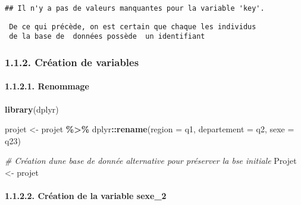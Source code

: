 \documentclass[
]{article}
\newenvironment{Shaded}{\begin{snugshade}}{\end{snugshade}}
\newcommand{\AttributeTok}[1]{\textcolor[rgb]{0.13,0.29,0.53}{#1}}
\newcommand{\CommentTok}[1]{\textcolor[rgb]{0.56,0.35,0.01}{\textit{#1}}}
\newcommand{\FunctionTok}[1]{\textcolor[rgb]{0.13,0.29,0.53}{\textbf{#1}}}
\newcommand{\NormalTok}[1]{#1}
\newcommand{\OtherTok}[1]{\textcolor[rgb]{0.56,0.35,0.01}{#1}}
\newcommand{\SpecialCharTok}[1]{\textcolor[rgb]{0.81,0.36,0.00}{\textbf{#1}}}
\begin{document}
\begin{verbatim}
## Il n'y a pas de valeurs manquantes pour la variable 'key'.
\end{verbatim}

\begin{verbatim}
 De ce qui précède, on est certain que chaque les individus 
 de la base de  données possède  un identifiant
\end{verbatim}

\hypertarget{cruxe9ation-de-variables}{%
\subsubsection{1.1.2. Création de
variables}\label{cruxe9ation-de-variables}}

\hypertarget{renommage}{%
\paragraph{1.1.2.1. Renommage}\label{renommage}}

\begin{Shaded}
\begin{Highlighting}[]
\FunctionTok{library}\NormalTok{(dplyr)}


\NormalTok{projet }\OtherTok{\textless{}{-}}\NormalTok{ projet }\SpecialCharTok{\%\textgreater{}\%}
\NormalTok{  dplyr}\SpecialCharTok{::}\FunctionTok{rename}\NormalTok{(}\AttributeTok{region =}\NormalTok{ q1,}
         \AttributeTok{departement =}\NormalTok{ q2,}
         \AttributeTok{sexe =}\NormalTok{ q23)}
\end{Highlighting}
\end{Shaded}

\begin{Shaded}
\begin{Highlighting}[]
\CommentTok{\# Création d\textquotesingle{}une base de donnée alternative pour préserver la bse initiale}
\NormalTok{Projet }\OtherTok{\textless{}{-}}\NormalTok{ projet}
\end{Highlighting}
\end{Shaded}

\hypertarget{cruxe9ation-de-la-variable-sexe_2}{%
\paragraph{1.1.2.2. Création de la variable
sexe\_2}\label{cruxe9ation-de-la-variable-sexe_2}}
\end{document}

